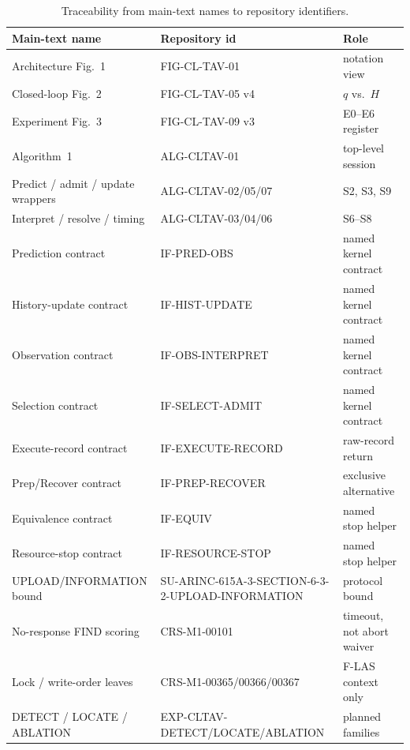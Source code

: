 \documentclass[11pt,letterpaper]{article}
\begin{document}
\begin{table}[h]
\centering
\caption{Traceability from main-text names to repository identifiers.}
\label{tab:trace}
\small
\begin{tabularx}{\textwidth}{@{}>{\raggedright\arraybackslash}p{}>{\raggedright\arraybackslash}p{}X@{}}
\hline
Main-text name & Repository id & Role \\
\hline
Architecture Fig.~1 & FIG-CL-TAV-01 & notation view \\
Closed-loop Fig.~2 & FIG-CL-TAV-05 v4 & \(q\) vs.\ \(H\) \\
Experiment Fig.~3 & FIG-CL-TAV-09 v3 & E0--E6 register \\
Algorithm~1 & ALG-CLTAV-01 & top-level session \\
Predict / admit / update wrappers & ALG-CLTAV-02/05/07 & S2, S3, S9 \\
Interpret / resolve / timing & ALG-CLTAV-03/04/06 & S6--S8 \\
Prediction contract & IF-PRED-OBS & named kernel contract \\
History-update contract & IF-HIST-UPDATE & named kernel contract \\
Observation contract & IF-OBS-INTERPRET & named kernel contract \\
Selection contract & IF-SELECT-ADMIT & named kernel contract \\
Execute-record contract & IF-EXECUTE-RECORD & raw-record return \\
Prep/Recover contract & IF-PREP-RECOVER & exclusive alternative \\
Equivalence contract & IF-EQUIV & named stop helper \\
Resource-stop contract & IF-RESOURCE-STOP & named stop helper \\
UPLOAD/INFORMATION bound & SU-ARINC-615A-3-\allowbreak SECTION-6-3-2-\allowbreak UPLOAD-INFORMATION & protocol bound \\
No-response FIND scoring & CRS-M1-00101 & timeout, not abort waiver \\
Lock / write-order leaves & CRS-M1-00365/00366/00367 & F-LAS context only \\
DETECT / LOCATE / ABLATION & EXP-CLTAV-DETECT/\allowbreak LOCATE/\allowbreak ABLATION & planned families \\
\hline
\end{tabularx}
\end{table}
\end{document}

